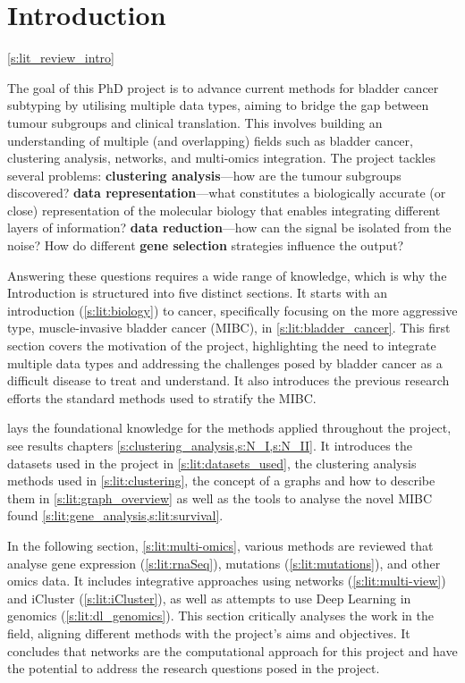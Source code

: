 

\chapter{Introduction} \cref{s:lit_review_intro}


The goal of this PhD project is to advance current methods for bladder cancer subtyping by utilising multiple data types, aiming to bridge the gap between tumour subgroups and clinical translation. This involves building an understanding of multiple (and overlapping) fields such as bladder cancer, clustering analysis, networks, and multi-omics integration. The project tackles several problems: \textbf{clustering analysis}—how are the tumour subgroups discovered? \textbf{data representation}—what constitutes a biologically accurate (or close) representation of the molecular biology that enables integrating different layers of information? \textbf{data reduction}—how can the signal be isolated from the noise? How do different \textbf{gene selection} strategies influence the output?

Answering these questions requires a wide range of knowledge, which is why the Introduction is structured into five distinct sections. It starts with an introduction (\cref{s:lit:biology}) to cancer, specifically focusing on the more aggressive type, muscle-invasive bladder cancer (MIBC), in \cref{s:lit:bladder_cancer}. This first section covers the motivation of the project, highlighting the need to integrate multiple data types and addressing the challenges posed by bladder cancer as a difficult disease to treat and understand. It also introduces the previous research efforts the standard methods used to stratify the MIBC.

 lays the foundational knowledge for the methods applied throughout the project, see results chapters \cref{s:clustering_analysis,s:N_I,s:N_II}. It introduces the datasets used in the project in \cref{s:lit:datasets_used}, the clustering analysis methods used in \cref{s:lit:clustering}, the concept of a graphs and how to describe them in \cref{s:lit:graph_overview} as well as the tools to analyse the novel MIBC found \cref{s:lit:gene_analysis,s:lit:survival}. 


In the following section, \ref{s:lit:multi-omics}, various methods are reviewed that analyse gene expression (\cref{s:lit:rnaSeq}), mutations (\cref{s:lit:mutations}), and other omics data. It includes integrative approaches using networks (\cref{s:lit:multi-view}) and iCluster (\cref{s:lit:iCluster}), as well as attempts to use Deep Learning in genomics (\cref{s:lit:dl_genomics}). This section critically analyses the work in the field, aligning different methods with the project's aims and objectives. It concludes that networks are the computational approach for this project and have the potential to address the research questions posed in the project.

